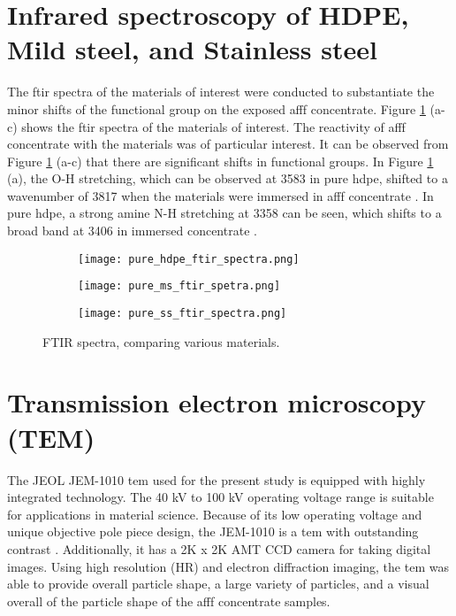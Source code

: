 \section{Infrared spectroscopy of HDPE, Mild steel, and Stainless steel}  
\label{ch5:anchor:section:spectroscopy}

The \acrshort{ftir} spectra of the materials of interest were conducted to substantiate the minor shifts of the functional group on the exposed \acrshort{afff} concentrate. Figure \ref{ch5:figure:materials} (a-c) shows the \acrshort{ftir} spectra of the materials of interest. The reactivity of \acrshort{afff} concentrate with the materials was of particular interest. It can be observed from Figure \ref{ch5:figure:materials} (a-c) that there are significant shifts in functional groups. In Figure \ref{ch5:figure:materials} (a), the O-H stretching, which can be observed at 3583 in pure \acrshort{hdpe}, shifted to a wavenumber of 3817 when the materials were immersed in \acrshort{afff} concentrate \cite{mudunkotuwa2014atr}. In pure \acrshort{hdpe}, a strong amine N-H stretching at 3358 can be seen, which shifts to a broad band at 3406 in immersed concentrate \cite{mohamed2017fourier}.

\begin{figure}[H]
\centering

\begin{subfigure}{.45\textwidth}
    \texttt{[image: pure\_hdpe\_ftir\_spectra.png]}
    \caption{}
\end{subfigure}
\begin{subfigure}{.45\textwidth}
    \texttt{[image: pure\_ms\_ftir\_spetra.png]}
    \caption{}
\end{subfigure}
\begin{subfigure}{.45\textwidth}
    \texttt{[image: pure\_ss\_ftir\_spectra.png]}
    \caption{}
\end{subfigure}

\caption{FTIR spectra, comparing various materials.}
\label{ch5:figure:materials}
\end{figure}

\section{Transmission electron microscopy (TEM)}
The JEOL JEM-1010 \acrshort{tem} used for the present study is equipped with highly integrated technology. The 40 kV to 100 kV operating voltage range is suitable for applications in material science. Because of its low operating voltage and unique objective pole piece design, the JEM-1010 is a \acrshort{tem} with outstanding contrast \cite{klein2011transmission}. Additionally, it has a 2K x 2K AMT CCD camera for taking digital images. Using high resolution (HR) and electron diffraction imaging, the \acrshort{tem} was able to provide overall particle shape, a large variety of particles, and a visual overall of the particle shape of the \acrshort{afff} concentrate samples. 

